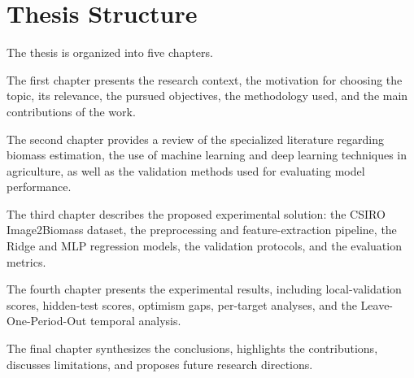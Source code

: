 \section{Thesis Structure}

The thesis is organized into five chapters.

The first chapter presents the research context, the motivation for choosing the topic, its relevance, the pursued objectives, the methodology used, and the main contributions of the work.

The second chapter provides a review of the specialized literature regarding biomass estimation, the use of machine learning and deep learning techniques in agriculture, as well as the validation methods used for evaluating model performance.

The third chapter describes the proposed experimental solution: the CSIRO Image2Biomass dataset, the preprocessing and feature-extraction pipeline, the Ridge and MLP regression models, the validation protocols, and the evaluation metrics.

The fourth chapter presents the experimental results, including local-validation scores, hidden-test scores, optimism gaps, per-target analyses, and the Leave-One-Period-Out temporal analysis.

The final chapter synthesizes the conclusions, highlights the contributions, discusses limitations, and proposes future research directions.




